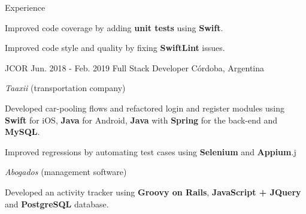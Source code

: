 \documentclass{curriculum}
\begin{document}
\begin{cvsection}{Experience}
        \begin{sectionitemlist}
        \item{Improved code coverage by adding \textbf{unit tests} using \textbf{Swift}.}
        \item{Improved code style and quality by fixing \textbf{SwiftLint} issues.}
        \end{sectionitemlist}


    \makesectionitemheader
        {JCOR}                                              {Jun. 2018 - Feb. 2019}
        {Full Stack Developer}                                 {Córdoba, Argentina}

        \begin{sectionitemlist}

        \item{\textit{Taaxii} (transportation company)}
            \begin{sectionitemlist}
            \item{
                Developed car-pooling flows and refactored login and register
                modules using \textbf{Swift} for iOS, \textbf{Java} for Android,
                \textbf{Java} with \textbf{Spring} for the back-end and \textbf{MySQL}.
            }
            \item{
                Improved regressions by automating test cases
                using \textbf{Selenium} and \textbf{Appium}.j
            }
            \end{sectionitemlist}

        \item{\textit{Abogados} (management software)}
            \begin{sectionitemlist}
            \item{
                Developed an activity tracker using
                \textbf{Groovy on Rails}, \textbf{JavaScript + JQuery}
                and \textbf{PostgreSQL} database.
            }
            \end{sectionitemlist}

        \end{sectionitemlist}

\end{cvsection}

\end{document}
